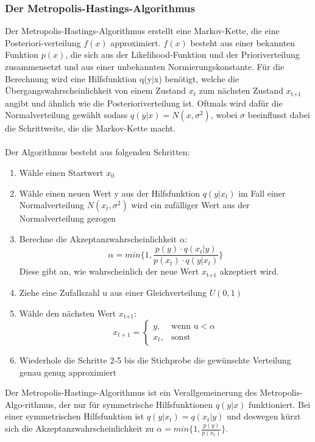 \documentclass[a4paper,12pt]{article}
\begin{document}
\subsubsection{Der Metropolis-Hastings-Algorithmus}
Der Metropolis-Hastings-Algorithmus erstellt eine Markov-Kette, die eine Posteriori-verteilung $f(x)$ approximiert. $f(x)$ besteht aus einer bekannten Funktion $p(x)$, die sich aus der Likelihood-Funktion und der Prioriverteilung zusammensetzt und aus einer unbekannten Normierungskonstante. Für die Berechnung wird eine Hilfsfunktion q(y$|$x) benötigt, welche die Übergangswahrscheinlichkeit von einem Zustand $x_t$ zum nächsten Zustand $x_{\text{t+1}}$ angibt und ähnlich wie die Posterioriverteilung ist. Oftmals wird dafür die Normalverteilung gewählt sodass $q(y|x) = N(x,\sigma^2)$, wobei $\sigma$ beeinflusst dabei die Schrittweite, die die Markov-Kette macht. \parencite[226f.]{HandbookMonteCarloMethods} \\\\ 
Der Algorithmus besteht aus folgenden Schritten:
\begin{enumerate}
  \item Wähle einen Startwert $x_0$
  \item Wähle einen neuen Wert y aus der Hilfsfunktion $q(y|x_t)$ im Fall einer Normalverteilung $N(x_t,\sigma^2)$ wird ein zufälliger Wert aus der Normalverteilung gezogen
  \item Berechne die Akzeptanzwahrscheinlichkeit $\alpha$:
  \begin{equation}
    \alpha = min{\{1,\frac{p(y) \cdot q(x_t|y)}{p(x_t) \cdot q(y|x_t)}\}}
  \end{equation}
  Diese gibt an, wie wahrscheinlich der neue Wert $x_{\text{t+1}}$ akzeptiert wird.
  \item Ziehe eine Zufallszahl u aus einer Gleichverteilung $U(0,1)$
  \item Wähle den nächsten Wert $x_{\text{t+1}}$:
  \begin{equation}
    x_{t+1} = 
    \begin{cases}
      y, & \text{wenn u}< \alpha \\
      x_t, & \text{sonst}
    \end{cases}
  \end{equation}
  \item Wiederhole die Schritte 2-5 bis die Stichprobe die gewünschte Verteilung genau genug approximiert
\end{enumerate}
Der Metropolis-Hastings-Algorithmus ist ein Verallgemeinerung des Metropolis-Algo-rithmus, der nur für symmetrische Hilfsfunktionen $q(y|x)$ funktioniert. Bei einer symmetrischen Hilfsfunktion ist $q(y|x_t) = q(x_t|y)$ und deswegen kürzt sich die Akzeptanzwahrscheinlichkeit zu $\alpha = min{\{1,\frac{p(y)}{p(x_t)}\}}$. \parencite[226f.]{HandbookMonteCarloMethods} \\\\
\end{document}

